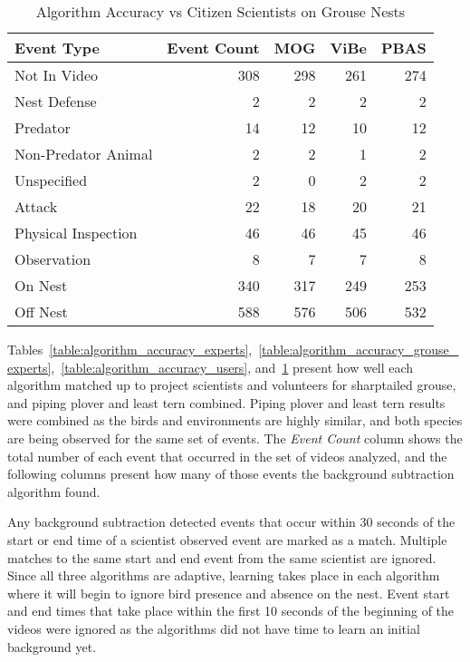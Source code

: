 \begin{table}
\centering
\caption{Algorithm Accuracy vs Citizen Scientists on Grouse Nests}
\label{table:algorithm_accuracy_grouse_users}
\begin{tabular}{lrrrr}
    \toprule
    Event Type & Event Count & MOG & ViBe & PBAS\\
    \midrule
    Not In Video & 308 & 298 & 261 & 274\\
    Nest Defense & 2 & 2 & 2 & 2\\
    Predator & 14 & 12 & 10 & 12\\
    Non-Predator Animal & 2 & 2 & 1 & 2\\
    Unspecified & 2 & 0 & 2 & 2\\
    Attack & 22 & 18 & 20 & 21\\
    Physical Inspection & 46 & 46 & 45 & 46\\
    Observation & 8 & 7 & 7 & 8\\
    On Nest & 340 & 317 & 249 & 253\\
    Off Nest & 588 & 576 & 506 & 532\\
    \bottomrule
\end{tabular}
\end{table}

Tables~\ref{table:algorithm_accuracy_experts},~\ref{table:algorithm_accuracy_grouse_experts},~\ref{table:algorithm_accuracy_users}, and~\ref{table:algorithm_accuracy_grouse_users} present how well each algorithm matched up to project scientists and volunteers for sharptailed grouse, and piping plover and least tern combined. Piping plover and least tern results were combined as the birds and environments are highly similar, and both species are being observed for the same set of events. The \emph{Event Count} column shows the total number of each event that occurred in the set of videos analyzed, and the following columns present how many of those events the background subtraction algorithm found.

Any background subtraction detected events that occur within 30 seconds of the start or end time of a scientist observed event are marked as a match. Multiple matches to the same start and end event from the same scientist are ignored. Since all three algorithms are adaptive, learning takes place in each algorithm where it will begin to ignore bird presence and absence on the nest. Event start and end times that take place within the first 10 seconds of the beginning of the videos were ignored as the algorithms did not have time to learn an initial background yet.

